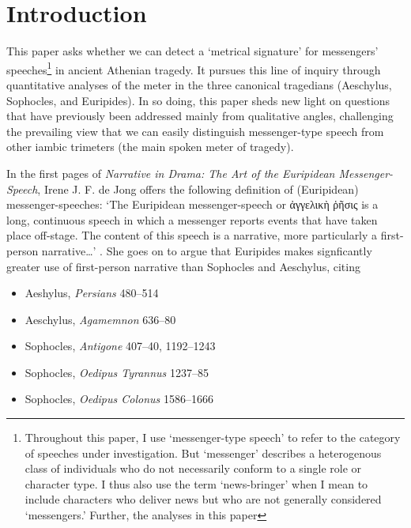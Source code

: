 \documentclass[
]{ceurart}
\begin{document}
\section{Introduction}

This paper asks whether we can detect a `metrical signature' for messengers'
speeches\footnote{Throughout this paper, I use `messenger-type speech' to refer to
the category of speeches under investigation. But `messenger' describes a heterogenous
class of individuals who do not necessarily conform to a single role or character type.
I thus also use the term `news-bringer' when I mean to include characters who deliver
news but who are not generally considered `messengers.' Further, the analyses in this paper
} in ancient Athenian tragedy. It pursues this line of inquiry through
quantitative analyses of the meter in the three canonical tragedians
(Aeschylus, Sophocles, and Euripides). In so doing, this paper sheds new
light on questions that have previously been addressed mainly from
qualitative angles, challenging the prevailing view that we can easily
distinguish messenger-type speech from other iambic trimeters (the main
spoken meter of tragedy).

In the first pages of \textit{Narrative in Drama: The Art of the Euripidean
Messenger-Speech}, Irene J. F. de Jong offers the following definition of
(Euripidean) messenger-speeches: `The Euripidean messenger-speech or ἀγγελικὴ
ῥῆσις is a long, continuous speech in which a messenger reports events that
have taken place off-stage. The content of this speech is a narrative, more
particularly a first-person narrative…' \cite[1–2]{deJong1991}. She goes on to
argue that Euripides makes signficantly greater use of first-person narrative
than Sophocles and Aeschylus, citing \cite[2 n. 4]{deJong1991}

\begin{itemize}
  \item Aeshylus, \textit{Persians} 480–514
  \item Aeschylus, \textit{Agamemnon} 636–80
  \item Sophocles, \textit{Antigone} 407–40, 1192–1243
  \item Sophocles, \textit{Oedipus Tyrannus} 1237–85
  \item Sophocles, \textit{Oedipus Colonus} 1586–1666
\end{itemize}
\end{document}
